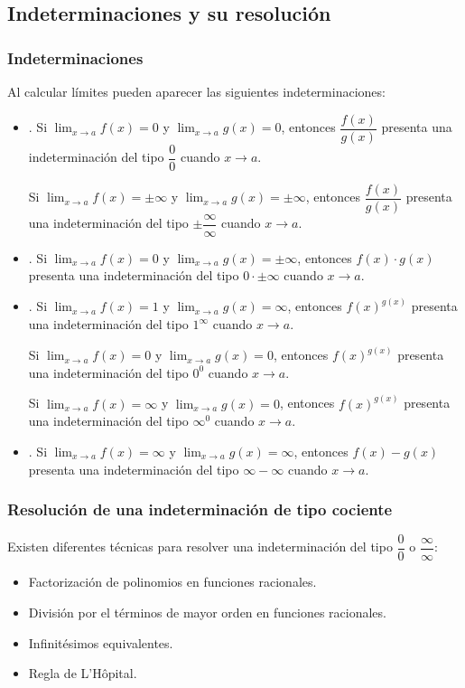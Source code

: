 \subsection{Indeterminaciones y su resolución}
\begin{frame}
\frametitle{Indeterminaciones}
Al calcular límites pueden aparecer las siguientes indeterminaciones:
\begin{itemize}
\item {}. Si $\lim_{x\rightarrow a} f(x)=0$ y $\lim_{x\rightarrow a} g(x)=0$, entonces
$\dfrac{f(x)}{g(x)}$ presenta una indeterminación del tipo \alert{$\dfrac{0}{0}$} cuando $x\rightarrow a$.

Si $\lim_{x\rightarrow a} f(x)=\pm\infty$ y $\lim_{x\rightarrow a} g(x)=\pm\infty$, entonces $\dfrac{f(x)}{g(x)}$ presenta una indeterminación del tipo \alert{$\pm\dfrac{\infty}{\infty}$} cuando $x\rightarrow a$.

\item {}. Si $\lim_{x\rightarrow a} f(x)=0$ y $\lim_{x\rightarrow a} g(x)=\pm\infty$,
 entonces $f(x)\cdot g(x)$ presenta una indeterminación del tipo \alert{$0\cdot \pm\infty$} cuando $x\rightarrow a$.
\item {}. Si $\lim_{x\rightarrow a} f(x)=1$ y $\lim_{x\rightarrow a} g(x)=\infty$,
entonces $f(x)^{g(x)}$ presenta una indeterminación del tipo \alert{$1^\infty$} cuando $x\rightarrow a$.

Si $\lim_{x\rightarrow a} f(x)=0$ y $\lim_{x\rightarrow a} g(x)=0$, entonces $f(x)^{g(x)}$ presenta una indeterminación del tipo \alert{$0^0$} cuando $x\rightarrow a$.

Si $\lim_{x\rightarrow a} f(x)=\infty$ y $\lim_{x\rightarrow a} g(x)=0$, entonces $f(x)^{g(x)}$ presenta una indeterminación del tipo \alert{$\infty^0$} cuando $x\rightarrow a$.

\item {}. Si $\lim_{x\rightarrow a} f(x)=\infty$ y $\lim_{x\rightarrow a}
 g(x)=\infty$, entonces $f(x)-g(x)$ presenta una indeterminación del tipo \alert{$\infty-\infty$} cuando $x\rightarrow a$.
\end{itemize}
\end{frame}


\begin{frame}
\frametitle{Resolución de una indeterminación de tipo cociente}
Existen diferentes técnicas para resolver una indeterminación del tipo $\dfrac{0}{0}$ o $\dfrac{\infty}{\infty}$:
\begin{itemize}
\item Factorización de polinomios en funciones racionales.
\item División por el términos de mayor orden en funciones racionales.
\item Infinitésimos equivalentes.
\item Regla de L'Hôpital.
\end{itemize}
\end{frame}


